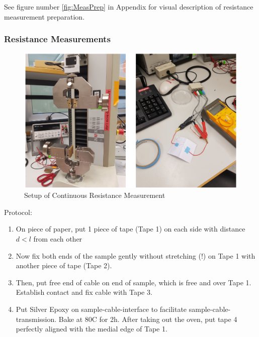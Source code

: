     \begin{center}
    
See figure number \ref{fig:MeasPrep} in Appendix for visual description of resistance measurement preparation.
    \end{center}


\subsubsection{Resistance Measurements}

\begin{figure}[H]
    \centerline{\includegraphics[scale=0.7]{./pic/MethodsResMeasurement.PNG}}
    \caption{Setup of Continuous Resistance Measurement}
    \label{fig:ContResMeas}
\end{figure}

Protocol:

\begin{enumerate}
	\item On piece of paper, put 1 piece of tape (Tape 1) on each side with distance $d < l$ from each other
	
	\item Now fix both ends of the sample gently without stretching (!) on Tape 1 with another piece of tape (Tape 2).
	
	\item Then, put free end of cable on end of sample, which is free and over Tape 1. Establish contact and fix cable with Tape 3.
	
	\item Put Silver Epoxy on sample-cable-interface to facilitate sample-cable-transmission. Bake at 80\textdegree C for 2h. After taking out the oven, put tape 4 perfectly aligned with the medial edge of Tape 1.
\end{enumerate}

